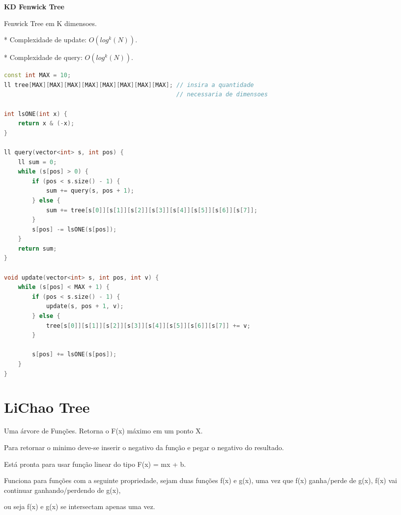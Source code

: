 \documentclass[11pt, a4paper, oneside]{book}
\begin{document}
\textbf{KD Fenwick Tree} 



Fenwick Tree em K dimensoes.



* Complexidade de update: $O(log^k(N))$.

* Complexidade de query: $O(log^k(N))$.
\hfill

\begin{multicols}{2}
\begin{lstlisting}[language=C++]
const int MAX = 10;
ll tree[MAX][MAX][MAX][MAX][MAX][MAX][MAX][MAX]; // insira a quantidade
                                                 // necessaria de dimensoes

int lsONE(int x) {
    return x & (-x);
}

ll query(vector<int> s, int pos) {
    ll sum = 0;
    while (s[pos] > 0) {
        if (pos < s.size() - 1) {
            sum += query(s, pos + 1);
        } else {
            sum += tree[s[0]][s[1]][s[2]][s[3]][s[4]][s[5]][s[6]][s[7]];
        }
        s[pos] -= lsONE(s[pos]);
    }
    return sum;
}

void update(vector<int> s, int pos, int v) {
    while (s[pos] < MAX + 1) {
        if (pos < s.size() - 1) {
            update(s, pos + 1, v);
        } else {
            tree[s[0]][s[1]][s[2]][s[3]][s[4]][s[5]][s[6]][s[7]] += v;
        }

        s[pos] += lsONE(s[pos]);
    }
}\end{lstlisting}
\end{multicols}

\hfill

\section{LiChao Tree}


Uma árvore de Funções. Retorna o F(x) máximo em um ponto X.



Para retornar o minimo deve-se inserir o negativo da função e pegar o negativo do resultado.



Está pronta para usar função linear do tipo F(x) = mx + b.



Funciona para funções com a seguinte propriedade, sejam duas funções f(x) e g(x), uma vez que f(x) ganha/perde de g(x), f(x) vai continuar ganhando/perdendo de g(x),

ou seja f(x) e g(x) se intersectam apenas uma vez.
\end{document}
